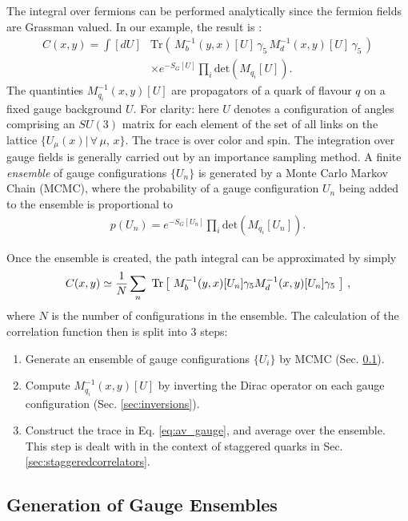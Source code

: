 The integral over fermions can be performed analytically since the fermion fields are Grassman valued. In our example, the result is \cite{Peskin:1995ev}:
\begin{align}
  \nonumber
  C(x,y) = \int [dU] &\text{Tr}\left( \, M^{-1}_b(y,x)[U] \, \gamma_5 \, M^{-1}_d(x,y)[U] \, \gamma_5 \, \right) \\ &\times e^{-S_G[U]} \prod_i\text{det}(M_{q_i}[U]).
  \label{eq:lattice_correlator}
\end{align}
The quantinties $M_{q_i}^{-1}(x,y)[U]$ are propagators of a quark of flavour $q$ on a fixed gauge background $U$. For clarity: here $U$ denotes a configuration of angles comprising an $SU(3)$ matrix for each element of the set of all links on the lattice $\{ U_{\mu}(x) | \,\forall \,\mu,\,x \}$. The trace is over color and spin. The integration over gauge fields is generally carried out by an importance sampling method. A finite \textit{ensemble} of gauge configurations $\{U_n\}$ is generated by a Monte Carlo Markov Chain (MCMC), where the probability of a gauge configuration $U_n$ being added to the ensemble is proportional to
\begin{align}
  p(U_n) = e^{-S_G[U_n]}\prod_i\text{det}(M_{q_i}[U_n]).
  \label{eq:MCweight}
\end{align}

Once the ensemble is created, the path integral can be approximated by simply
\begin{align}
  C(x,y) \simeq {1\over N} \sum_n \text{ Tr}\left[\text{ } M^{-1}_b(y,x)[U_n] \gamma_5 M^{-1}_d(x,y)[U_n] \gamma_5 \text{ }\right]\,,
  \label{eq:av_gauge}
\end{align}
where $N$ is the number of configurations in the ensemble. The calculation of the correlation function then is split into 3 steps:
\begin{enumerate}
\item
  Generate an ensemble of gauge configurations $\{ U_i \}$ by MCMC (Sec. \ref{sec:MCMC}).
\item
  Compute $M^{-1}_{q_i}(x,y)[U]$ by inverting the Dirac operator on each gauge configuration (Sec. \ref{sec:inversions}).
\item
  Construct the trace in Eq. \eqref{eq:av_gauge}, and average over the ensemble. This step is dealt with in the context of staggered quarks in Sec. \ref{sec:staggeredcorrelators}.
\end{enumerate}


\subsection{Generation of Gauge Ensembles}
\label{sec:MCMC}

